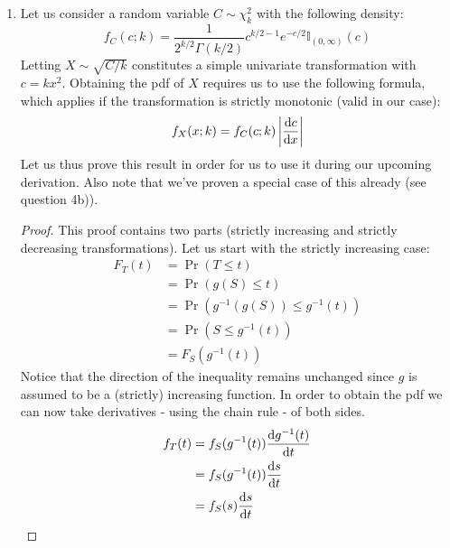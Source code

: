 \documentclass[12pt]{article}
\begin{document}
\begin{enumerate}
\begin{enumerate}[label=(\roman*)]
\item
Let us consider a random variable $C \sim \chi_k^{2} $ with the following density:
\begin{equation*}
f_C(c;k) = \frac{1}{2^{k/2} \Gamma(k/2)} c^{k/2-1}e^{-c/2} \mathbb{I}_{(0,\infty)}(c)
\end{equation*}
Letting $X \sim \sqrt{C/k}$ constitutes a simple univariate transformation with $c = kx^{2}$. Obtaining the pdf of $X$ requires us to use the following formula, which applies if the transformation is strictly monotonic (valid in our case):
\begin{equation*}
f_X(x;k) = f_C(c;k) \left| \frac{\mathop{}\!\mathrm{d} c}{\mathop{}\!\mathrm{d} x} \right|
\end{equation*}
Let us thus prove this result in order for us to use it during our upcoming derivation. Also note that we've proven a special case of this already (see question 4b)).
\begin{proof}
This proof contains two parts (strictly increasing and strictly decreasing transformations). Let us start with the strictly increasing case:
\begin{align*}
F_T(t) &= \Pr(T \leq t) \\
&= \Pr(g(S) \leq t) \\
&= \Pr(g^{-1}(g(S)) \leq g^{-1}(t)) \\
&= \Pr(S \leq g^{-1}(t)) \\
&= F_S(g^{-1}(t))
\end{align*}
Notice that the direction of the inequality remains unchanged since $g$ is assumed to be a (strictly) increasing function. In order to obtain the pdf we can now take derivatives - using the chain rule - of both sides.
\begin{align*}
f_T(t) &= f_S(g^{-1}(t)) \frac{\mathop{}\!\mathrm{d} g^{-1}(t)}{\mathop{}\!\mathrm{d} t} \\
&= f_S(g^{-1}(t)) \frac{\mathop{}\!\mathrm{d} s}{\mathop{}\!\mathrm{d} t} \\
&= f_S(s) \frac{\mathop{}\!\mathrm{d} s}{\mathop{}\!\mathrm{d} t}
\end{align*}

\end{proof}
\end{enumerate}
\end{enumerate}
\end{document}
